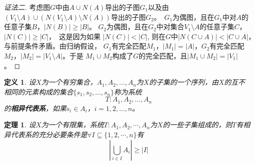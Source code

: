 \documentclass{article}
\newtheorem{Def}{定义}
\newtheorem{Thm}{定理}
\begin{document}
\begin{CJK*}{UTF8}{gbsn}
\begin{proof}[证法二]
考虑图$G$中由$A \cup N(A)$导出的子图$G_1$以及由$(V_1\setminus A) \cup
(N(V_1\setminus A)\setminus N(A))$导出的子图$G_2$。　$G_1$为偶图，且在$G_1$中对$A$的任意子集$B$，$|N(B)| \geq |B|$。
$G_2$为偶图，且在$G_2$中对集合$V_1\setminus A$的任意子集$C$，　$|N(C)| \geq |C|$，　这是因为如果
$|N(C)| < |C|$, 则在$G$中$|N(C \cup A)| < |C \cup A|$，　与前提条件矛盾。由归纳假设，
$G_1$有完全匹配$M_1$，$|M_1|=|A|$，$G_2$有完全匹配$M_2$，$|M_2|=|V_1\setminus A|$。于是
$M_1\cup M_2$构成了$G$的完全匹配，且$|M_1\cup M_2| = |V_1|$。
  \end{proof}
    \begin{Def}
    设$X$为一个有穷集合，$A_1,A_2,\ldots,A_n$为$X$的子集的一个序列，由$X$的互不
    相同的元素构成的集合$\{s_1,s_2,\ldots,s_n\}$称为系统\[T:A_1,A_2,\ldots,A_n\]的{\bfseries 相异代表系}，如果$s_i\in A_i$，$i=1,2,\ldots,n$。
  \end{Def}
  \begin{Thm}
    设$X$为一个有限集，系统$T:A_1,A_2,\cdots,A_n$为$X$的一些子集组成的，则$T$有相异代表系的充分必要条件是$\forall I \subseteq \{1,2,\cdots, n\}$有
    \[|\bigcup_{i\in I}A_i|\geq |I|\]
  \end{Thm}




\end{CJK*}
\end{document}
